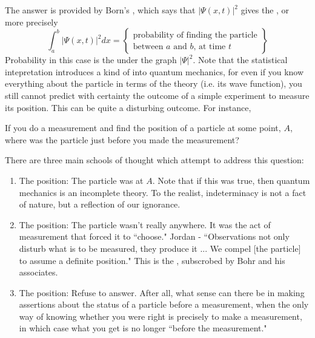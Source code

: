 \documentclass[12pt, a4paper, oneside, openright, titlepage]{book}
\begin{document}
The answer is provided by Born's , which says that $|\Psi(x,t)|^2$ gives the , or more precisely \begin{equation*}
    \int_a^b|\Psi(x,t)|^2dx = \left\{\begin{array}{c} \text{probability of finding the particle} \\ \text{between $a$ and $b$, at time $t$}\end{array}\right\}
\end{equation*}
Probability in this case is the  under the graph $|\Psi|^2$. Note that the statistical intepretation introduces a kind of  into quantum mechanics, for even if you know everything about the particle in terms of the theory (i.e. its wave function), you still cannot predict with certainty the outcome of a simple experiment to measure its position. This can be quite a disturbing outcome. For instance,

\begin{qst}
    If you do a measurement and find the position of a particle at some point, $A$, where was the particle just before you made the measurement?
\end{qst}

There are three main schools of thought which attempt to address this question: 

\begin{enumerate}
    \item The  position: The particle was at $A$. Note that if this was true, then quantum mechanics is an incomplete theory. To the realist, indeterminacy is not a fact of nature, but a reflection of our ignorance.
    \item The  position: The particle wasn't really anywhere. It was the act of measurement that forced it to ``choose." Jordan - ``Observations not only disturb what is to be measured, they produce it ... We compel [the particle] to assume a definite position." This is the , subscrobed by Bohr and his associates.
    \item The  position: Refuse to answer. After all, what sense can there be in making assertions about the status of a particle before a measurement, when the only way of knowing whether you were right is precisely to make a measurement, in which case what you get is no longer ``before the measurement."
\end{enumerate}
\end{document}
